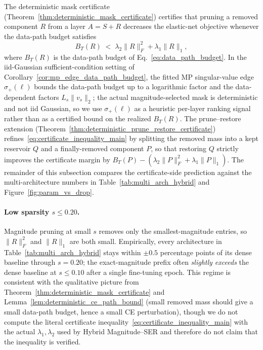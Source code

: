 \documentclass[11pt]{article}
\theoremstyle{plain}
\theoremstyle{definition}
\theoremstyle{remark}
\newcommand{\1}{\mathbf{1}}
\begin{document}
The deterministic mask certificate (Theorem~\ref{thm:deterministic_mask_certificate}) certifies that pruning a removed component \(R\) from a layer \(A=S+R\) decreases the elastic-net objective whenever the data-path budget satisfies
\begin{equation}
\label{eq:certificate_inequality_main}
B_T(R)\;<\;\lambda_2\|R\|_F^2+\lambda_1\|R\|_1,
\end{equation}
where \(B_T(R)\) is the data-path budget of Eq.~\eqref{eq:data_path_budget}.  In the iid-Gaussian sufficient-condition setting of Corollary~\ref{cor:mp_edge_data_path_budget}, the fitted MP singular-value edge \(\sigma_+(\ell)\) bounds the data-path budget up to a logarithmic factor and the data-dependent factors \(L_s\|v_s\|_2\); the actual magnitude-selected mask is deterministic and not iid Gaussian, so we use \(\sigma_+(\ell)\) as a heuristic per-layer ranking signal rather than as a certified bound on the realized \(B_T(R)\).  The prune--restore extension (Theorem~\ref{thm:deterministic_prune_restore_certificate}) refines~\eqref{eq:certificate_inequality_main} by splitting the removed mass into a kept reservoir \(Q\) and a finally-removed component \(P\), so that restoring \(Q\) strictly improves the certificate margin by \(B_T(P)-(\lambda_2\|P\|_F^2+\lambda_1\|P\|_1)\).  The remainder of this subsection compares the certificate-side prediction against the multi-architecture numbers in Table~\ref{tab:multi_arch_hybrid} and Figure~\ref{fig:param_vs_drop}.

\paragraph{Low sparsity \(s\le 0.20\).}  Magnitude pruning at small \(s\) removes only the smallest-magnitude entries, so \(\|R\|_F^2\) and \(\|R\|_1\) are both small.  Empirically, every architecture in Table~\ref{tab:multi_arch_hybrid} stays within \(\pm 0.5\) percentage points of its dense baseline through \(s=0.20\); the exact-magnitude prefix often \emph{slightly exceeds} the dense baseline at \(s\le 0.10\) after a single fine-tuning epoch.  This regime is consistent with the qualitative picture from Theorem~\ref{thm:deterministic_mask_certificate} and Lemma~\ref{lem:deterministic_ce_path_bound} (small removed mass should give a small data-path budget, hence a small CE perturbation), though we do not compute the literal certificate inequality~\eqref{eq:certificate_inequality_main} with the actual \(\lambda_1,\lambda_2\) used by Hybrid Magnitude--SER and therefore do not claim that the inequality is verified.
\end{document}
